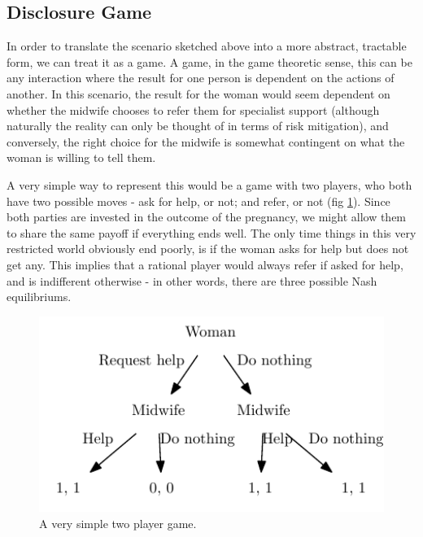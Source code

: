 \subsection{Disclosure Game}
\label{sub:the_game}


In order to translate the scenario sketched above into a more abstract, tractable form, we can treat it as a game. A game, in the game theoretic sense, this can be any interaction where the result for one person is dependent on the actions of another. In this scenario, the result for the woman would seem dependent on whether the midwife chooses to refer them for specialist support (although naturally the reality can only be thought of in terms of risk mitigation), and conversely, the right choice for the midwife is somewhat contingent on what the woman is willing to tell them.

A very simple way to represent this would be a game with two players, who both have two possible moves - ask for help, or not; and refer, or not (fig \ref{fig:simplest_game}). Since both parties are invested in the outcome of the pregnancy, we might allow them to share the same payoff if everything ends well. The only time things in this very restricted world obviously end poorly, is if the woman asks for help but does not get any. This implies that a rational player would always refer if asked for help, and is indifferent otherwise - in other words, there are three possible Nash equilibriums.


\begin{figure}[H]
\begin{adjustbox}{center}
\includegraphics[width=119mm]{figures/simplest_game}
\end{adjustbox}
\caption{A very simple two player game.}

\label{fig:simplest_game}
\end{figure}

